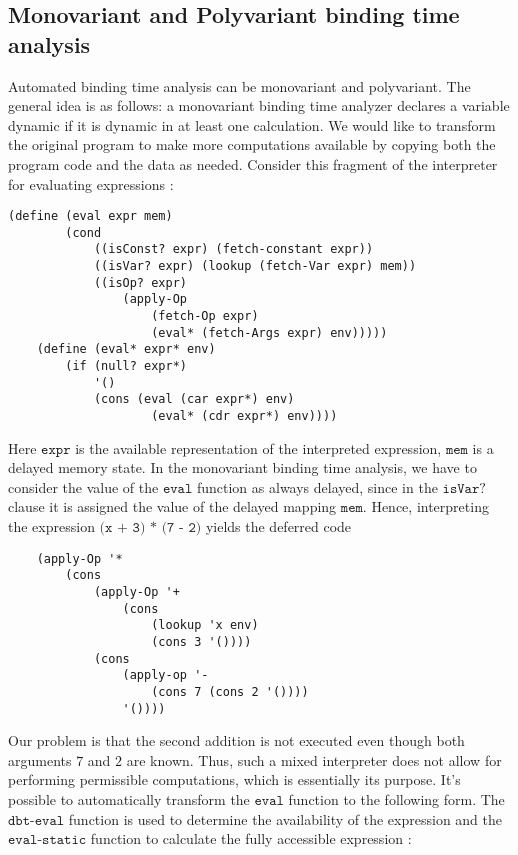 \documentclass[11pt]{article}
\theoremstyle{definition}
\newcommand{\code}[1]{\texttt{#1}}
\newcommand\tab[1][1cm]{\hspace*{#1}}
\begin{document}
 \subsection{Monovariant and Polyvariant binding time analysis}
\tab Automated binding time analysis can be monovariant and polyvariant. The general idea is as follows: a monovariant binding time analyzer declares a variable dynamic if it is dynamic in at least one calculation. We would like to transform the original program to make more computations available by copying both the program code and the data as needed. Consider this fragment of the interpreter for evaluating expressions \cite{bulyonkov1993extracting}:
\begin{lstlisting}[]
    (define (eval expr mem)
        (cond 
            ((isConst? expr) (fetch-constant expr))
            ((isVar? expr) (lookup (fetch-Var expr) mem))
            ((isOp? expr)
                (apply-Op
                    (fetch-Op expr)
                    (eval* (fetch-Args expr) env)))))
    (define (eval* expr* env)
        (if (null? expr*) 
            '()
            (cons (eval (car expr*) env)
                    (eval* (cdr expr*) env))))
\end{lstlisting}
\tab Here $\code{expr}$ is the available representation of the interpreted expression, $\code{mem}$ is a delayed memory state. In the monovariant binding time analysis, we have to consider the value of the $\code{eval}$ function as always delayed, since in the $\code{isVar?}$ clause it is assigned the value of the delayed mapping $\code{mem}$. Hence, interpreting the expression $\code{(x + 3) * (7 - 2)}$ yields the deferred code 
\begin{lstlisting}
    (apply-Op '*
        (cons
            (apply-Op '+
                (cons 
                    (lookup 'x env)
                    (cons 3 '())))
            (cons 
                (apply-op '-
                    (cons 7 (cons 2 '())))
                '())))
\end{lstlisting}
\tab Our problem is that the second addition is not executed even though both arguments $7$ and $2$ are known. Thus, such a mixed interpreter does not allow for performing permissible computations, which is essentially its purpose. \newline
\tab It's possible to automatically transform the $\code{eval}$ function to the following form. The $\code{dbt-eval}$ function is used to determine the availability of the expression and the $\code{eval-static}$ function to calculate the fully accessible expression \cite{bulyonkov1993extracting}:
\end{document}
